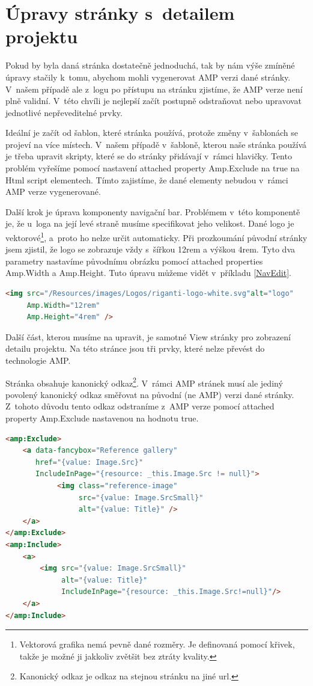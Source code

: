 \section{Úpravy stránky s~detailem projektu}
Pokud by byla daná stránka dostatečně jednoduchá, tak by nám výše zmíněné úpravy stačily k~tomu, abychom mohli vygenerovat AMP verzi dané stránky. V~našem případě ale z~logu po přístupu na stránku zjistíme, že AMP verze není plně validní. V~této chvíli je nejlepší začít postupně odstraňovat nebo upravovat jednotlivé nepřeveditelné prvky.

Ideální je začít od šablon, které stránka používá, protože změny v~šablonách se projeví na více místech. V~našem případě v~šabloně, kterou naše stránka používá je třeba upravit skripty, které se do stránky přidávají v~rámci hlavičky. Tento problém vyřešíme pomocí nastavení attached property Amp.Exclude na true na Html script elementech. Tímto zajistíme, že dané elementy nebudou v~rámci AMP verze vygenerované.

Další krok je úprava komponenty navigační bar. Problémem v~této komponentě je, že u~loga na její levé straně musíme specifikovat jeho velikost. Dané logo je vektorové\footnote{Vektorová grafika nemá pevně dané rozměry. Je definovaná pomocí křivek, takže je možné ji jakkoliv zvětšit bez ztráty kvality.}, a~proto ho nelze určit automaticky. Při prozkoumání původní stránky jsem zjistil, že logo se zobrazuje vždy s~šířkou 12rem a výškou 4rem. Tyto dva parametry nastavíme původnímu obrázku pomocí attached properties Amp.Width a Amp.Height. Tuto úpravu můžeme vidět v~příkladu \ref{NavEdit}.
\begin{lstlisting}[language=html, caption=Upřesnění velikosti obrázku.,label=NavEdit,captionpos=t]
<img src="/Resources/images/Logos/riganti-logo-white.svg"alt="logo"
     Amp.Width="12rem"
     Amp.Height="4rem" />
\end{lstlisting}

Další část, kterou musíme na upravit, je samotné View stránky pro zobrazení detailu projektu. Na této stránce jsou tři prvky, které nelze převést do technologie AMP.

Stránka obsahuje kanonický odkaz\footnote{Kanonický odkaz je odkaz na stejnou stránku na jiné url.}. V~rámci AMP stránek musí ale jediný povolený kanonický odkaz směřovat na původní (ne AMP) verzi dané stránky. Z~tohoto důvodu tento odkaz odstraníme z~AMP verze pomocí attached property Amp.Exclude nastavenou na hodnotu true.

\begin{lstlisting}[language=html, caption=Odstranění komponenty fancybox.,label=fancybox,captionpos=t]
<amp:Exclude>
	<a data-fancybox="Reference gallery"
	   href="{value: Image.Src}"
	   IncludeInPage="{resource: _this.Image.Src != null}">
	        <img class="reference-image"
	             src="{value: Image.SrcSmall}"
	             alt="{value: Title}" />
	</a>
</amp:Exclude>
<amp:Include>
	<a>
		<img src="{value: Image.SrcSmall}"
		     alt="{value: Title}"
		     IncludeInPage="{resource: _this.Image.Src!=null}"/>
	</a>
</amp:Include>

\end{lstlisting}

